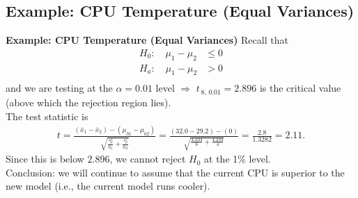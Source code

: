 \documentclass[compress]{beamer}        %
\makeatletter
\newcommand{\tcb}{\textcolor{beamer@blendedblue}}
\makeatother
\begin{document}
\subsection{Example: CPU Temperature (Equal Variances)}
\begin{frame}{\bf \tcb{Example: CPU Temperature (Equal Variances)}}
Recall that\\[-1.2cm]
\begin{align*}
H_0:\quad \mu_1-\mu_2 &\le 0 \\[0.2cm]
H_a:\quad \mu_1-\mu_2 &> 0 \\[-0.4cm]
\end{align*}
and we are testing at the $\alpha=0.01$ level $\Rightarrow$ $t_{\,8,\,0.01} = 2.896$ is the critical value (above which the rejection region lies).\\[0.4cm]
The test statistic is
\begin{align*}
t=\frac{(\bar x_1 - \bar x_2)-(\mu_{01}-\mu_{02})}{\sqrt{\frac{s_p^2}{n_1}+\frac{s_p^2}{n_2}}}=
\frac{(32.0 - 29.2)-(0)}{\sqrt{\frac{4.234}{6}+\frac{4.234}{4}}} = \frac{2.8}{1.3282} = 2.11.
\end{align*}
Since this is below $2.896$, we cannot reject $H_0$ at the 1\% level.\\[0.4cm]

Conclusion: we will continue to assume that the current CPU is superior to the new model (i.e., the current model runs cooler).

\end{frame}

%
%
%
%
%
%
%
%
%
\end{document}
